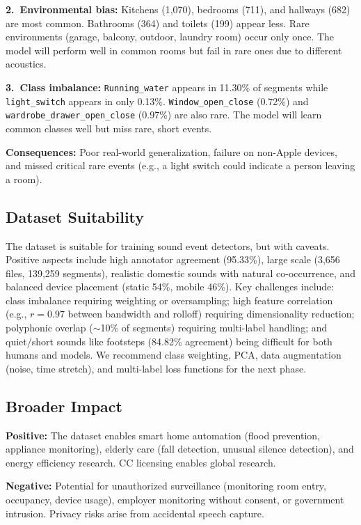 \documentclass{article}
\begin{document}
\textbf{2.~Environmental bias:} Kitchens (1,070), bedrooms (711), and hallways (682) are most common. Bathrooms (364) and toilets (199) appear less. Rare environments (garage, balcony, outdoor, laundry room) occur only once. The model will perform well in common rooms but fail in rare ones due to different acoustics.

\textbf{3.~Class imbalance:} \texttt{Running\_water} appears in 11.30\% of segments while \texttt{light\_switch} appears in only 0.13\%. \texttt{Window\_open\_close} (0.72\%) and \texttt{wardrobe\_drawer\_open\_close} (0.97\%) are also rare. The model will learn common classes well but miss rare, short events.

\textbf{Consequences:} Poor real-world generalization, failure on non-Apple devices, and missed critical rare events (e.g., a light switch could indicate a person leaving a room).

\subsection{Dataset Suitability}

The dataset is suitable for training sound event detectors, but with caveats. Positive aspects include high annotator agreement (95.33\%), large scale (3,656 files, 139,259 segments), realistic domestic sounds with natural co-occurrence, and balanced device placement (static 54\%, mobile 46\%). Key challenges include: class imbalance requiring weighting or oversampling; high feature correlation (e.g., $r=0.97$ between bandwidth and rolloff) requiring dimensionality reduction; polyphonic overlap (${\sim}$10\% of segments) requiring multi-label handling; and quiet/short sounds like footsteps (84.82\% agreement) being difficult for both humans and models. We recommend class weighting, PCA, data augmentation (noise, time stretch), and multi-label loss functions for the next phase.

\subsection{Broader Impact}

\textbf{Positive:} The dataset enables smart home automation (flood prevention, appliance monitoring), elderly care (fall detection, unusual silence detection), and energy efficiency research. CC licensing enables global research.

\textbf{Negative:} Potential for unauthorized surveillance (monitoring room entry, occupancy, device usage), employer monitoring without consent, or government intrusion. Privacy risks arise from accidental speech capture.
\end{document}
